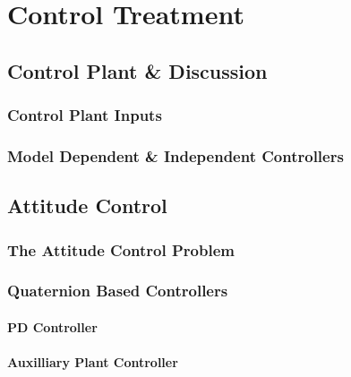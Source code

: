 \chapter{Control Treatment}
\label{ch:control}
\section*{Control Plant \& Discussion}
\subsection*{Control Plant Inputs}
\subsection*{Model Dependent \& Independent Controllers}

\section{Attitude Control}
\label{sec:control.attitude}
\subsection{The Attitude Control Problem}
\label{subsec:control.attitude.problem}
\subsection{Quaternion Based Controllers}
\label{subsec:control.attitude.quaternion}
\subsubsection{PD Controller}
\subsubsection{Auxilliary Plant Controller}
